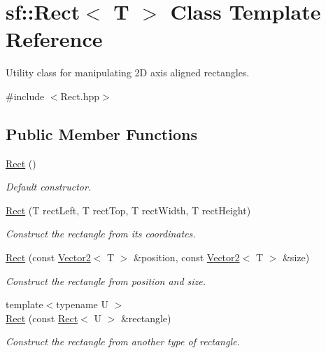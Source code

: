 \hypertarget{classsf_1_1_rect}{}\section{sf\+:\+:Rect$<$ T $>$ Class Template Reference}
\label{classsf_1_1_rect}


Utility class for manipulating 2D axis aligned rectangles.  




{\ttfamily \#include $<$Rect.\+hpp$>$}

\subsection*{Public Member Functions}
\begin{DoxyCompactItemize}
\item 
\hyperlink{classsf_1_1_rect_a0f87ebaef9722a6222fd2e04ce8efb37}{Rect} ()
\begin{DoxyCompactList}\small\item\em Default constructor. \end{DoxyCompactList}\item 
\hyperlink{classsf_1_1_rect_a15cdbc5a1aed3a8fc7be1bd5004f19f9}{Rect} (T rect\+Left, T rect\+Top, T rect\+Width, T rect\+Height)
\begin{DoxyCompactList}\small\item\em Construct the rectangle from its coordinates. \end{DoxyCompactList}\item 
\hyperlink{classsf_1_1_rect_a27fdf85caa6d12caeeff78913cc59936}{Rect} (const \hyperlink{classsf_1_1_vector2}{Vector2}$<$ T $>$ \&position, const \hyperlink{classsf_1_1_vector2}{Vector2}$<$ T $>$ \&size)
\begin{DoxyCompactList}\small\item\em Construct the rectangle from position and size. \end{DoxyCompactList}\item 
{\footnotesize template$<$typename U $>$ }\\\hyperlink{classsf_1_1_rect_a6fff2bb7e93677839461a66bc2957de0}{Rect} (const \hyperlink{classsf_1_1_rect}{Rect}$<$ U $>$ \&rectangle)
\begin{DoxyCompactList}\small\item\em Construct the rectangle from another type of rectangle. \end{DoxyCompactList}\item 

\end{DoxyCompactItemize}
